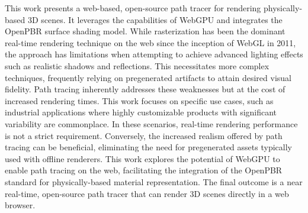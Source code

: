 
This work presents a web-based, open-source path tracer for rendering physically-based 3D scenes. It leverages the capabilities of WebGPU and integrates the OpenPBR surface shading model. While rasterization has been the dominant real-time rendering technique on the web since the inception of WebGL in 2011, the approach has limitations when attempting to achieve advanced lighting effects such as realistic shadows and reflections. This necessitates more complex techniques, frequently relying on pregenerated artifacts to attain desired visual fidelity. Path tracing inherently addresses these weaknesses but at the cost of increased rendering times. This work focuses on specific use cases, such as industrial applications where highly customizable products with significant variability are commonplace. In these scenarios, real-time rendering performance is not a strict requirement. Conversely, the increased realism offered by path tracing can be beneficial, eliminating the need for pregenerated assets typically used with offline renderers. This work explores the potential of WebGPU to enable path tracing on the web, facilitating the integration of the OpenPBR standard for physically-based material representation. The final outcome is a near real-time, open-source path tracer that can render 3D scenes directly in a web browser.
